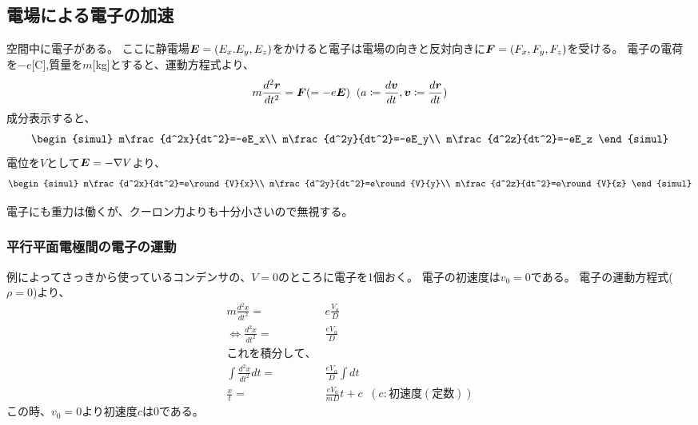 \documentclass[12pt]{ltjsarticle}
\begin{document}
\subsection{電場による電子の加速}
空間中に電子がある。
ここに静電場$\bm E=(E_x.E_y,E_z)$をかけると電子は電場の向きと反対向きに$\bm F=(F_x, F_y, F_z)$を受ける。
電子の電荷を$-e$[C],質量を$m$[kg]とすると、運動方程式より、
\begin{align*}
m\frac{d^2\bm r}{dt^2}=\bm F(=-e\bm E)\;\;
(a\coloneqq\frac{d\bm v}{dt},\bm v\coloneqq\frac{d\bm r}{dt})
\end{align*}
成分表示すると、
\begin{align*}
\begin{simul}
m\frac{d^2x}{dt^2}=-eE_x\\
m\frac{d^2y}{dt^2}=-eE_y\\
m\frac{d^2z}{dt^2}=-eE_z
\end{simul}
\end{align*}
電位を$V$として$\bm E=-\nabla V$より、
\begin{align*}
\begin{simul}
m\frac{d^2x}{dt^2}=e\round{V}{x}\\
m\frac{d^2y}{dt^2}=e\round{V}{y}\\
m\frac{d^2z}{dt^2}=e\round{V}{z}
\end{simul}
\end{align*}

電子にも重力は働くが、クーロン力よりも十分小さいので無視する。


\subsubsection{平行平面電極間の電子の運動}
例によってさっきから使っているコンデンサの、$V=0$のところに電子を1個おく。
電子の初速度は$v_0=0$である。
電子の運動方程式($\rho=0$)より、
\begin{align*}
m\frac{d^2x}{dt^2}=&e\frac{V_a}{D}\\
\Leftrightarrow \frac{d^2x}{dt^2}=&\frac{eV_a}{D}\\
これを積分して、\\
\int\frac{d^2x}{dt^2}dt=&\frac{eV_a}{D}\int dt\\
\frac xt =& \frac{eV_a}{mD}t+c\;\;(c:初速度(定数))
\end{align*}
この時、$v_0=0$より初速度$c$は0である。
\end{document}
